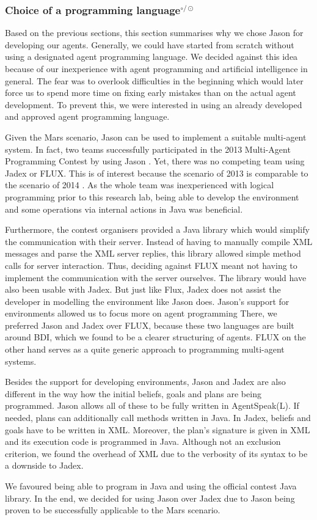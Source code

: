 \subsubsection[Choice of a programming language]{Choice of a programming language$^{\circ/\odot}$}\label{fun:apl_choice}
Based on the previous sections, this section summarises why we chose Jason for developing our agents.
Generally, we could have started from scratch without using a designated agent programming language.
We decided against this idea because of our inexperience with agent programming and artificial intelligence in general.
The fear was to overlook difficulties in the beginning which would later force us to spend more time on fixing early mistakes than on the actual agent development.
To prevent this, we were interested in using an already developed and approved agent programming language.

Given the Mars scenario, Jason can be used to implement a suitable multi-agent system.
In fact, two teams successfully participated in the 2013 Multi-Agent Programming Contest by using Jason \cite{ahlbrecht_multi_2013}. %
Yet, there was no competing team using Jadex or FLUX.
This is of interest because the scenario of 2013 is comparable to the scenario of 2014 \cite{ahlbrecht_mapc_2014}. %
As the whole team was inexperienced with logical programming prior to this research lab, being able to develop the environment and some operations via internal actions in Java was beneficial.

Furthermore, the contest organisers provided a Java library which would simplify the communication with their server.
Instead of having to manually compile XML messages and parse the XML server replies, this library allowed simple method calls for server interaction.
Thus, deciding against FLUX meant not having to implement the communication with the server ourselves.
The library would have also been usable with Jadex.
But just like Flux, Jadex does not assist the developer in modelling the environment like Jason does.
Jason's support for environments allowed us to focus more on agent programming
There, we preferred Jason and Jadex over FLUX, because these two languages are built around BDI, which we found to be a clearer structuring of agents.
FLUX on the other hand serves as a quite generic approach to programming multi-agent systems.

Besides the support for developing environments, Jason and Jadex are also different in the way how the initial beliefs, goals and plans are being programmed.
Jason allows all of these to be fully written in AgentSpeak(L).
If needed, plans can additionally call methods written in Java.
In Jadex, beliefs and goals have to be written in XML.
Moreover, the plan's signature is given in XML and its execution code is programmed in Java.
Although not an exclusion criterion, we found the overhead of XML due to the verbosity of its syntax to be a downside to Jadex.

We favoured being able to program in Java and using the official contest Java library.
In the end, we decided for using Jason over Jadex due to Jason being proven to be successfully applicable to the Mars scenario.
